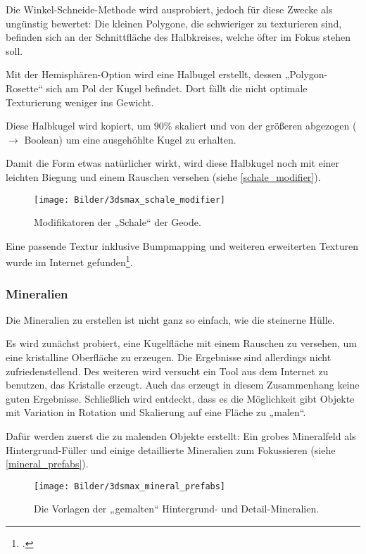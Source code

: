 \documentclass{scrreprt}
\begin{document}
Die Winkel-Schneide-Methode wird ausprobiert, jedoch für diese Zwecke als ungünstig bewertet: Die kleinen Polygone, die schwieriger zu texturieren sind, befinden sich an der Schnittfläche des Halbkreises, welche öfter im Fokus stehen soll.

Mit der Hemisphären-Option wird eine Halbugel erstellt, dessen „Polygon-Rosette“ sich am Pol der Kugel befindet. Dort fällt die nicht optimale Texturierung weniger ins Gewicht.

Diese Halbkugel wird kopiert, um $90\%$ skaliert und von der größeren abgezogen ($\to$ Boolean) um eine ausgehöhlte Kugel zu erhalten.

Damit die Form etwas natürlicher wirkt, wird diese Halbkugel noch mit einer leichten Biegung und einem Rauschen versehen (siehe \autoref{schale_modifier}).

\begin{figure}[!ht]
\centering
\texttt{[image: Bilder/3dsmax\_schale\_modifier]}
\caption{Modifikatoren der „Schale“ der Geode.}
\label{schale_modifier}
\end{figure}

Eine passende Textur inklusive Bumpmapping und weiteren erweiterten Texturen wurde im Internet gefunden\footcite{cgtextures2017}.

\subsubsection{Mineralien}

Die Mineralien zu erstellen ist nicht ganz so einfach, wie die steinerne Hülle. 

Es wird zunächst probiert, eine Kugelfläche mit einem Rauschen zu versehen, um eine kristalline Oberfläche zu erzeugen. Die Ergebnisse sind allerdings nicht zufriedenstellend. Des weiteren wird versucht ein Tool aus dem Internet zu benutzen, das Kristalle erzeugt. Auch das erzeugt in diesem Zusammenhang keine guten Ergebnisse. Schließlich wird entdeckt, dass es die Möglichkeit gibt Objekte mit Variation in Rotation und Skalierung auf eine Fläche zu „malen“. 

Dafür werden zuerst die zu malenden Objekte erstellt: Ein grobes Mineralfeld als Hintergrund-Füller und einige detaillierte Mineralien zum Fokussieren (siehe \autoref{mineral_prefabs}).

\begin{figure}[!ht]
\centering
\texttt{[image: Bilder/3dsmax\_mineral\_prefabs]}
\caption{Die Vorlagen der „gemalten“ Hintergrund- und Detail-Mineralien.}
\label{mineral_prefabs}
\end{figure}
\end{document}
